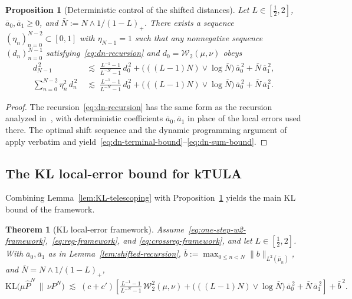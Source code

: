 \documentclass[11pt,a4paper,reqno]{amsart}
\theoremstyle{plain}
\newtheorem{theorem}{Theorem}
\newtheorem{proposition}{Proposition}
\theoremstyle{definition}
\theoremstyle{remark}
\newcommand{\KL}{\mathrm{KL}}
\newcommand{\W}{\mathcal{W}_2}
\begin{document}
\begin{proposition}[Deterministic control of the shifted distances]
\label{prop:deterministic-dn}
Let $L\in[\tfrac12,2]$, $\overline a_0,\overline a_1\ge0$, and $\bar N := N\wedge 1/(1-L)_{+}$.
There exists a sequence
$(\eta_n)_{n=0}^{N-2}\subset[0,1]$ with $\eta_{N-1}=1$ such that any
nonnegative sequence $(d_n)_{n=0}^{N-1}$
satisfying~\eqref{eq:dn-recursion} and $d_0=\W(\mu,\nu)$ obeys
\begin{align}
  d_{N-1}^{\,2}
  &\;\lesssim\;
  \tfrac{L^{-1}-1}{L^{-N}-1}\,d_0^{\,2}
  +\bigl(((L-1)N)\vee\log\bar N\bigr)\,\overline a_0^{\,2}
  +\bar N\,\overline a_1^{\,2},
  \label{eq:dn-terminal-bound}\\[2pt]
  \sum_{n=0}^{N-2}\eta_n^{2}\,d_n^{\,2}
  &\;\lesssim\;
  \tfrac{L^{-1}-1}{L^{-N}-1}\,d_0^{\,2}
  +\bigl(((L-1)N)\vee\log\bar N\bigr)\,\overline a_0^{\,2}
  +\bar N\,\overline a_1^{\,2}.
  \label{eq:dn-sum-bound}
\end{align}
\end{proposition}

\begin{proof}
The recursion~\eqref{eq:dn-recursion} has the same form as the
recursion analyzed in~\cite[Appendix~B.2]{chewi2024local}, with
deterministic coefficients $\overline a_0,\overline a_1$ in place of
the local errors used there. The optimal shift sequence and the dynamic
programming argument of~\cite[Lemmas~B.4--B.6]{chewi2024local} apply
verbatim and yield~\eqref{eq:dn-terminal-bound}--\eqref{eq:dn-sum-bound}.
\end{proof}

\subsection{The KL local-error bound for kTULA}
\label{subsec:framework-KL-bound}

Combining Lemma~\ref{lem:KL-telescoping} with
Proposition~\ref{prop:deterministic-dn} yields the main KL bound of the
framework.

\begin{theorem}[KL local-error framework]
\label{thm:KL-local-error-framework}
Assume~\eqref{eq:one-step-w2-framework},~\eqref{eq:reg-framework}, and
\eqref{eq:crossreg-framework}, and let $L\in[\tfrac12,2]$. With
$\overline a_0,\overline a_1$ as in Lemma~\ref{lem:shifted-recursion},
$\bar b := \max_{0\le n<N}\|b\|_{L^2(\widehat\mu_n)}$, and
$\bar N=N\wedge 1/(1-L)_{+}$,
\begin{equation}\label{eq:kl-blackbox}
  \KL\!\bigl(\mu\widehat P^{N}\,\|\,\nu P^{N}\bigr)
  \;\lesssim\;
  (c+c')\!\left[
    \tfrac{L^{-1}-1}{L^{-N}-1}\,\W^{2}(\mu,\nu)
    +\bigl(((L-1)N)\vee\log\bar N\bigr)\,\overline a_0^{\,2}
    +\bar N\,\overline a_1^{\,2}
  \right]
  +\bar b^{\,2}.
\end{equation}
\end{theorem}
\end{document}
